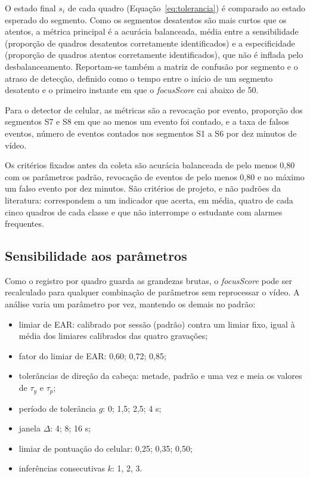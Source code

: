 \documentclass[portuguese,oneside]{tcc}
\newcommand{\fs}{\emph{focusScore}\xspace}
\begin{document}
O estado final $s_i$ de cada quadro (Equação~\ref{eq:tolerancia}) é comparado ao estado esperado do segmento. Como os segmentos desatentos são mais curtos que os atentos, a métrica principal é a acurácia balanceada, média entre a sensibilidade (proporção de quadros desatentos corretamente identificados) e a especificidade (proporção de quadros atentos corretamente identificados), que não é inflada pelo desbalanceamento. Reportam-se também a matriz de confusão por segmento e o atraso de detecção, definido como o tempo entre o início de um segmento desatento e o primeiro instante em que o \fs cai abaixo de 50.

Para o detector de celular, as métricas são a revocação por evento, proporção dos segmentos S7 e S8 em que ao menos um evento foi contado, e a taxa de falsos eventos, número de eventos contados nos segmentos S1 a S6 por dez minutos de vídeo.

Os critérios fixados antes da coleta são acurácia balanceada de pelo menos 0,80 com os parâmetros padrão, revocação de eventos de pelo menos 0,80 e no máximo um falso evento por dez minutos. São critérios de projeto, e não padrões da literatura: correspondem a um indicador que acerta, em média, quatro de cada cinco quadros de cada classe e que não interrompe o estudante com alarmes frequentes.

\subsection{Sensibilidade aos parâmetros}

Como o registro por quadro guarda as grandezas brutas, o \fs pode ser recalculado para qualquer combinação de parâmetros sem reprocessar o vídeo. A análise varia um parâmetro por vez, mantendo os demais no padrão:

\begin{itemize}
  \item limiar de EAR: calibrado por sessão (padrão) contra um limiar fixo, igual à média dos limiares calibrados das quatro gravações;
  \item fator do limiar de EAR: 0,60; 0,72; 0,85;
  \item tolerâncias de direção da cabeça: metade, padrão e uma vez e meia os valores de $\tau_y$ e $\tau_p$;
  \item período de tolerância $g$: 0; 1,5; 2,5; 4 s;
  \item janela $\Delta$: 4; 8; 16 s;
  \item limiar de pontuação do celular: 0,25; 0,35; 0,50;
  \item inferências consecutivas $k$: 1, 2, 3.
\end{itemize}
\end{document}
